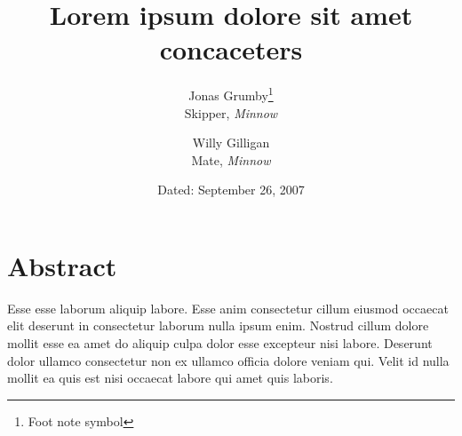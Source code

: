 \documentclass{article}
\title{Lorem ipsum dolore sit amet concaceters}
\author{Jonas Grumby\thanks{Foot note symbol} \\
  Skipper, \textit{Minnow}
  \and
  Willy Gilligan\footnotemark[1]\\
  Mate, \textit{Minnow}
  }
\date{Dated: September 26, 2007}
\begin{document}
\maketitle


  \section*{Abstract}
  Esse esse laborum aliquip labore. Esse anim consectetur cillum eiusmod occaecat elit deserunt in consectetur laborum nulla ipsum enim. Nostrud cillum dolore mollit esse ea amet do aliquip culpa dolor esse excepteur nisi labore. Deserunt dolor ullamco consectetur non ex ullamco officia dolore veniam qui. Velit id nulla mollit ea quis est nisi occaecat labore qui amet quis laboris.
\end{document}
